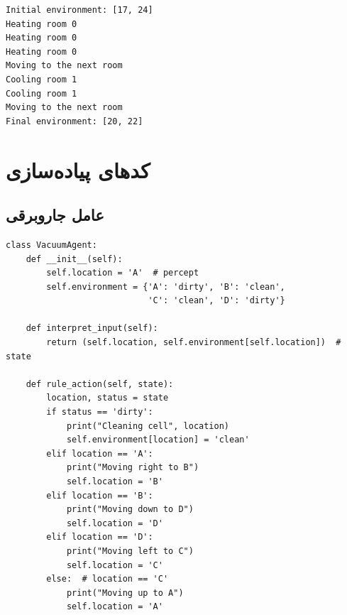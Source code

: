 \documentclass[12pt,a4paper]{article}
\theoremstyle{definition}
\begin{document}
\begin{latin}
\begin{lstlisting}[caption={خروجی اجرای عامل کنترل دما},label={code:temp}]
Initial environment: [17, 24]
Heating room 0
Heating room 0
Heating room 0
Moving to the next room
Cooling room 1
Cooling room 1
Moving to the next room
Final environment: [20, 22]
\end{lstlisting}
\end{latin}

\section{کدهای پیاده‌سازی}

\subsection{عامل جاروبرقی}
\begin{latin}
\begin{lstlisting}[caption={عامل جاروبرقی محیط $2 \times 2$}]
class VacuumAgent:
    def __init__(self):
        self.location = 'A'  # percept
        self.environment = {'A': 'dirty', 'B': 'clean',
                            'C': 'clean', 'D': 'dirty'}

    def interpret_input(self):
        return (self.location, self.environment[self.location])  # state

    def rule_action(self, state):
        location, status = state
        if status == 'dirty':
            print("Cleaning cell", location)
            self.environment[location] = 'clean'
        elif location == 'A':
            print("Moving right to B")
            self.location = 'B'
        elif location == 'B':
            print("Moving down to D")
            self.location = 'D'
        elif location == 'D':
            print("Moving left to C")
            self.location = 'C'
        else:  # location == 'C'
            print("Moving up to A")
            self.location = 'A'
\end{lstlisting}
\end{latin}
\end{document}
